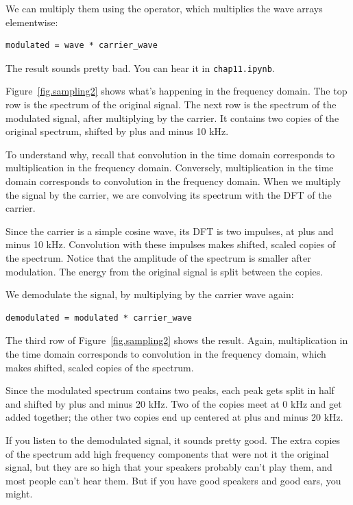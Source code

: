 \documentclass[12pt]{book}
\begin{document}
We can multiply them using the {\tt *} operator, which multiplies
the wave arrays elementwise:

\begin{verbatim}
modulated = wave * carrier_wave
\end{verbatim}

The result sounds pretty bad.  You can hear it in {\tt chap11.ipynb}.

Figure~\ref{fig.sampling2} shows what's happening in the frequency
domain.  The top row is the spectrum of the original signal.  The
next row is the spectrum of the modulated signal, after multiplying
by the carrier.  It contains two copies of the original spectrum,
shifted by plus and minus 10 kHz.

To understand why, recall that convolution in the time domain corresponds
to multiplication in the frequency domain.  Conversely, multiplication
in the time domain corresponds to convolution in the frequency domain.
When we multiply the signal by the carrier, we are convolving its
spectrum with the DFT of the carrier.

Since the carrier is a simple cosine wave, its DFT is two impulses, at
plus and minus 10 kHz.  Convolution with these impulses makes
shifted, scaled copies of the spectrum.  Notice that the amplitude of
the spectrum is smaller after modulation.  The energy from the original
signal is split between the copies.

We demodulate the signal, by multiplying by the carrier wave again:

\begin{verbatim}
demodulated = modulated * carrier_wave
\end{verbatim}

The third row of Figure~\ref{fig.sampling2} shows the result.  Again,
multiplication in the time domain corresponds to convolution in the
frequency domain, which makes shifted, scaled copies of the spectrum.

Since the modulated spectrum contains two peaks, each peak gets split
in half and shifted by plus and minus 20 kHz.  Two of the copies
meet at 0 kHz and get added together; the other two copies end up
centered at plus and minus 20 kHz.

If you listen to the demodulated signal, it sounds pretty good.  The
extra copies of the spectrum add high frequency components that were
not it the original signal, but they are so high that your speakers
probably can't play them, and most people can't hear them.  But if
you have good speakers and good ears, you might.
\end{document}

